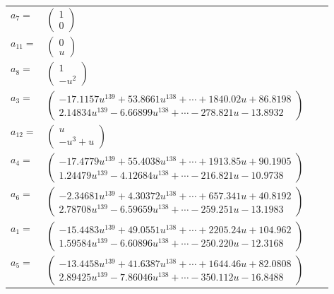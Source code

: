 \documentclass[1p]{elsarticle_modified}
\theoremstyle{definition}
\begin{document}
\begin{tabular}{m{7pt} m{180pt} m{7pt} m{180pt} }
\flushright $a_{7}=$&$\begin{pmatrix}1\\0\end{pmatrix}$ \\
\flushright $a_{11}=$&$\begin{pmatrix}0\\u\end{pmatrix}$ \\
\flushright $a_{8}=$&$\begin{pmatrix}1\\- u^2\end{pmatrix}$ \\
\flushright $a_{3}=$&$\begin{pmatrix}-17.1157 u^{139}+53.8661 u^{138}+\cdots+1840.02 u+86.8198\\2.14834 u^{139}-6.66899 u^{138}+\cdots-278.821 u-13.8932\end{pmatrix}$ \\
\flushright $a_{12}=$&$\begin{pmatrix}u\\- u^3+u\end{pmatrix}$ \\
\flushright $a_{4}=$&$\begin{pmatrix}-17.4779 u^{139}+55.4038 u^{138}+\cdots+1913.85 u+90.1905\\1.24479 u^{139}-4.12684 u^{138}+\cdots-216.821 u-10.9738\end{pmatrix}$ \\
\flushright $a_{6}=$&$\begin{pmatrix}-2.34681 u^{139}+4.30372 u^{138}+\cdots+657.341 u+40.8192\\2.78708 u^{139}-6.59659 u^{138}+\cdots-259.251 u-13.1983\end{pmatrix}$ \\
\flushright $a_{1}=$&$\begin{pmatrix}-15.4483 u^{139}+49.0551 u^{138}+\cdots+2205.24 u+104.962\\1.59584 u^{139}-6.60896 u^{138}+\cdots-250.220 u-12.3168\end{pmatrix}$ \\
\flushright $a_{5}=$&$\begin{pmatrix}-13.4458 u^{139}+41.6387 u^{138}+\cdots+1644.46 u+82.0808\\2.89425 u^{139}-7.86046 u^{138}+\cdots-350.112 u-16.8488\end{pmatrix}$ \\

\end{tabular}
\end{document}
